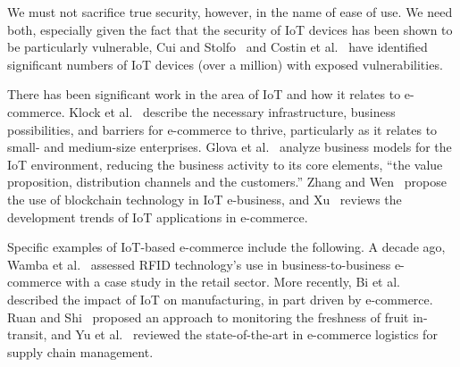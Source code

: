 We must not sacrifice true security, however, in the name of ease
of use.  We need both, especially given the fact that
the security of IoT devices has been shown to be particularly
vulnerable, Cui and Stolfo~\cite{cs11} and Costin et al.~\cite{Costin2014}
have identified significant numbers of IoT devices
(over a million) with exposed vulnerabilities.

There has been significant work in the area of IoT and how it relates
to e-commerce.
Klock et al.~\cite{kpm11} describe the necessary infrastructure,
business possibilities, and barriers for e-commerce to thrive, particularly
as it relates to small- and medium-size enterprises.
Glova et al.~\cite{gsv14} analyze business models for the IoT environment,
reducing the business activity to its core elements, ``the value proposition,
distribution channels and the customers.''
Zhang and Wen~\cite{zw17} propose the use of blockchain technology in IoT
e-business,
and Xu~\cite{Xu14} reviews the development trends of IoT applications
in e-commerce.

Specific examples of IoT-based e-commerce include the following.
A decade ago,
Wamba et al.~\cite{wlbl08} assessed RFID technology's use in 
business-to-business e-commerce with a case study in the retail sector.
More recently,
Bi et al.~\cite{bxw14} described the impact of IoT on manufacturing, in
part driven by e-commerce.
Ruan and Shi~\cite{rs16} proposed an approach to monitoring the
freshness of fruit in-transit, and
Yu et al.~\cite{ywzh16} reviewed the state-of-the-art in
e-commerce logistics for supply chain management.

